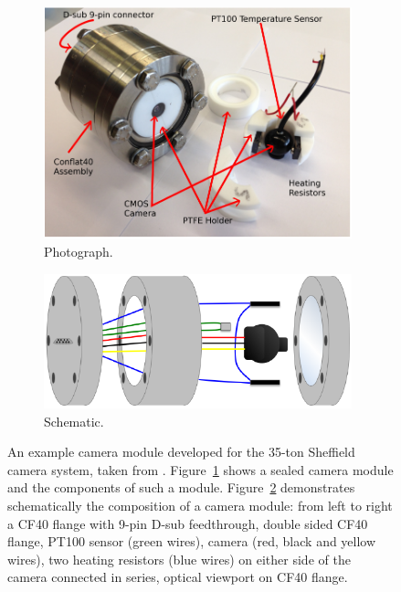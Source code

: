 \begin{figure}
  \centering
  \begin{subfigure}[t]{0.48\linewidth}
    \centering
    \includegraphics[width=0.98\textwidth]{35tonCameraPhoto.pdf}
    \caption{Photograph.}
    \label{fig:35tonCameraPhoto}
  \end{subfigure}
  \hfill
  \begin{subfigure}[t]{0.48\linewidth}
    \centering
    \includegraphics[width=0.98\textwidth]{35tonCameraSchematic.pdf}
    \caption{Schematic.}
    \label{fig:35tonCameraSchematic}
  \end{subfigure}
  \caption[An example camera module developed for the 35-ton Sheffield camera system.]{An example camera module developed for the 35-ton Sheffield camera system, taken from \cite{35tonCameras2017}.  Figure~\ref{fig:35tonCameraPhoto} shows a sealed camera module and the components of such a module.  Figure~\ref{fig:35tonCameraSchematic} demonstrates schematically the composition of a camera module: from left to right a CF40 flange with 9-pin D-sub feedthrough, double sided CF40 flange, PT100 sensor (green wires), camera (red, black and yellow wires), two heating resistors (blue wires) on either side of the camera connected in series, optical viewport on CF40 flange.}
  \label{fig:35tonCamera}
\end{figure}

